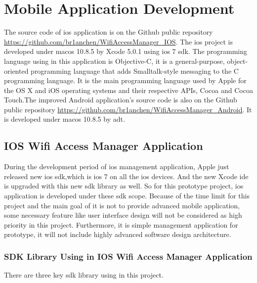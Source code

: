 \chapter{Mobile Application Development}
\label{chp:mobile_app}

\par The source code of \gls{ios} application is on the Github public repository \url{https://github.com/br1anchen/WifiAccessManager_IOS}. The \gls{ios} project is developed under \gls{macos} 10.8.5 by Xcode 5.0.1 using \gls{ios} 7 \gls{sdk}. The programming language using in this application is Objective-C\cite{objc}, it is a general-purpose, object-oriented programming language that adds Smalltalk-style messaging to the C programming language. It is the main programming language used by Apple for the OS X and iOS operating systems and their respective APIs, Cocoa and Cocoa Touch.The improved Android application's source code is also on the Github public repository \url{https://github.com/br1anchen/WifiAccessManager_Android}. It is developed under \gls{macos} 10.8.5 by \gls{adt}.

\section{IOS Wifi Access Manager Application}

\par During the development period of \gls{ios} management application, Apple just released new \gls{ios} \gls{sdk},which is \gls{ios} 7 on all the \gls{ios} devices. And the new Xcode \gls{ide} is upgraded with this new \gls{sdk} library as well. So for this prototype project, \gls{ios} application is developed under these \gls{sdk} scope. Because of the time limit for this project and the main goal of it is not to provide advanced mobile application, some necessary feature like user interface design will not be considered as high priority in this project. Furthermore, it is simple management application for prototype, it will not include highly advanced software design architecture.

\subsection{SDK Library Using in IOS Wifi Access Manager Application}
\par There are three key \gls{sdk} library using in this project. 

